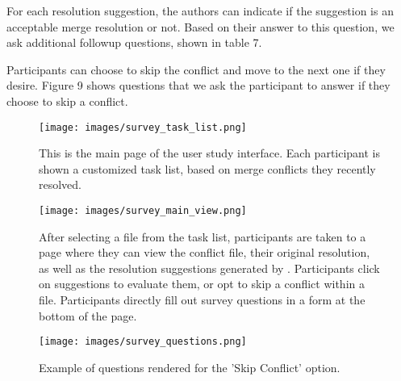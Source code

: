 For each resolution suggestion, the authors can indicate if the suggestion is an acceptable merge resolution or not.  Based on their answer to this question, we ask additional followup questions, shown in table 7.  

Participants can choose to skip the conflict and move to the next one if they desire.  Figure 9 shows questions that we ask the participant to answer if they choose to skip a conflict.



\begin{figure*}[th!]
\begin{center}
    \texttt{[image: images/survey\_task\_list.png]}
\caption{This is the main page of the user study interface. Each participant is shown a customized task list, based on merge conflicts they recently resolved.}
\end{center}
\end{figure*}

\begin{figure*}[th!]
\begin{center}
    \texttt{[image: images/survey\_main\_view.png]}
\caption{After selecting a file from the task list, participants are taken to a page where they can view the conflict file, their original resolution, as well as the resolution suggestions generated by \thistool{}. Participants click on suggestions to evaluate them, or opt to skip a conflict within a file. Participants directly fill out survey questions in a form at the bottom of the page. }
\end{center}
\end{figure*}


\begin{figure*}[th!]
\begin{center}
    \texttt{[image: images/survey\_questions.png]}
\caption{Example of questions rendered for the 'Skip Conflict' option. }
\end{center}
\end{figure*}


